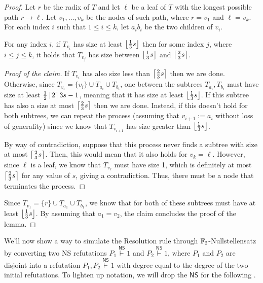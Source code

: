 \begin{proof}
    Let $r$ be the radix of $T$ and let $\ell$ be a leaf of $T$ with the longest possible path $r \to \ell$. Let $v_1, \ldots, v_k$ be the nodes of such path, where $r = v_1$ and $\ell = v_k$. For each index $i$ such that $1 \leq i \leq k$, let $a_i b_i$ be the two children of $v_i$.

    \begin{claimlemma}
        For any index $i$, if $T_{v_i}$ has size at least $\left \lfloor \frac{1}{3} s \right \rfloor$ then for some index $j$, where $i \leq j \leq k$, it holds that $T_{v_j}$ has size between $\left \lfloor \frac{1}{3} s \right \rfloor$ and $\left \lceil \frac{2}{3} s \right \rceil$.
    \end{claimlemma}

    \begin{proof}[Proof of the claim]
        If $T_{v_i}$ has also size less than $\left \lceil \frac{2}{3} s \right \rceil$ then we are done. Otherwise, since $T_{v_i} = \{v_i\} \cup T_{a_i} \cup T_{b_i}$, one between the subtrees $T_{a_i}, T_{b_i}$ must have size at least $\frac{1}{2} \left \lceil 2 \right \rceil{3} s - 1$, meaning that it has size at least $\left \lfloor \frac{1}{3} s \right \rfloor$. If this subtree has also a size at most $\left \lceil \frac{2}{3} s \right \rceil$ then we are done. Instead, if this doesn't hold for both subtrees, we can repeat the process (assuming that $v_{i+1} := a_i$ without loss of generality) since we know that $T_{v_{i+1}}$ has size greater than $\left \lfloor \frac{1}{3} s \right \rfloor$.

        By way of contradiction, suppose that this process never finds a subtree with size at most $\left \lceil \frac{2}{3} s \right \rceil$. Then, this would mean that it also holds for $v_k = \ell$. However, since $\ell$ is a leaf, we know that $T_{v_\ell}$ must have size 1, which is definitely at most $\left \lceil \frac{2}{3} s \right \rceil$ for any value of $s$, giving a contradiction. Thus, there must be a node that terminates the process.

    \end{proof}
    
    Since $T_{v_1} = \{r\} \cup T_{a_1} \cup T_{b_1}$, we know that for both of these subtrees must have at least $\left \lfloor \frac{1}{3} s \right \rfloor$. By assuming that $a_1 = v_{2}$, the claim concludes the proof of the lemma.
    
\end{proof}

We'll now show a way to simulate the Resolution rule through $\mathbb{F}_2$-Nullstellensatz by converting two \textsf{NS} refutations $P_1 \stackrel{\mathsf{NS}}{\vdash} 1$ and $P_2 \stackrel{\mathsf{NS}}{\vdash} 1$, where $P_1$ and $P_2$ are disjoint into a refutation  $P_1, P_2 \stackrel{\mathsf{NS}}{\vdash} 1$ with degree equal to the degree of the two initial refutations. To lighten up notation, we will drop the $\textsf{NS}$ for the following .

